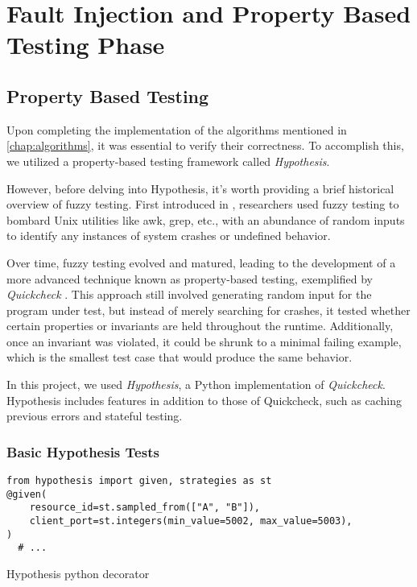 \section{Fault Injection and Property Based Testing Phase}


\subsection{Property Based Testing}
Upon completing the implementation of the algorithms mentioned in \ref{chap:algorithms}, it was essential to verify their correctness. To accomplish this, we utilized a property-based testing framework called \textit{Hypothesis}.

However, before delving into Hypothesis, it's worth providing a brief historical overview of fuzzy testing. First introduced in \cite{OG_fuzzy_testing}, researchers used fuzzy testing to bombard Unix utilities like awk, grep, etc., with an abundance of random inputs to identify any instances of system crashes or undefined behavior.

Over time, fuzzy testing evolved and matured, leading to the development of a
more advanced technique known as property-based testing, exemplified by
\textit{Quickcheck} \cite{quickcheck}. This approach still involved generating
random input for the program under test, but instead of merely searching for
crashes, it tested whether certain properties or invariants are held throughout the runtime. Additionally, once an invariant was violated, it could be shrunk to a minimal failing example, which is the smallest test case that would produce the same behavior.

In this project, we used \textit{Hypothesis}, a Python implementation of \textit{Quickcheck}.
Hypothesis includes features in addition to those of Quickcheck, such as caching previous errors and stateful testing.

\subsubsection{Basic Hypothesis Tests}
\label{subsubsec:basic_hypothesis_tests}


\begin{listing}[!ht]
  \begin{verbatim}
from hypothesis import given, strategies as st
@given(
    resource_id=st.sampled_from(["A", "B"]),
    client_port=st.integers(min_value=5002, max_value=5003),
)
  # ...
  \end{verbatim}
  \caption{Hypothesis python decorator}
  \label{code:hypothesis_decorator}
\end{listing}

